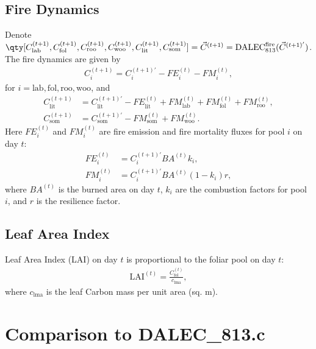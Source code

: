 \documentclass{article}
\begin{document}
		\subsection{Fire Dynamics}
			Denote $\qty[C_\text{lab}^{(t+1)}, C_\text{fol}^{(t+1)}, C_\text{roo}^{(t+1)}, C_\text{woo}^{(t+1)}, C_\text{lit}^{(t+1)}, C_\text{som}^{(t+1)}] = \vec{C}^{(t+1)} = \text{DALEC}_{813}^\text{fire}(\vec{C}^{(t+1)'})$.  The fire dynamics are given by
			\begin{align}
				C_i^{(t+1)} = C_i^{(t+1)'} - FE_i^{(t)} - FM_i^{(t)},
			\end{align}
			for $i = \text{lab}, \text{fol}, \text{roo}, \text{woo}$, and
			\begin{align}
				C_\text{lit}^{(t+1)} &= C_\text{lit}^{(t+1)'}  - FE_\text{lit}^{(t)} + FM_\text{lab}^{(t)} + FM_\text{fol}^{(t)} + FM_\text{roo}^{(t)},\\
				C_\text{som}^{(t+1)} &= C_\text{som}^{(t+1)'} - FM_\text{som}^{(t)} + FM_\text{woo}^{(t)}.
			\end{align}
			Here $FE_i^{(t)}$ and $FM_i^{(t)}$ are fire emission and fire mortality fluxes for pool $i$ on day $t$:
			\begin{align}
				FE_i^{(t)} &= C_i^{(t+1)'}BA^{(t)}k_i,\\
				FM_i^{(t)} &= C_i^{(t+1)'}BA^{(t)}(1-k_i)r,
			\end{align}
			where $BA^{(t)}$ is the burned area on day $t$, $k_i$ are the combustion factors for pool $i$, and $r$ is the resilience factor.

		\subsection{Leaf Area Index}
			Leaf Area Index (LAI) on day $t$ is proportional to the foliar pool on day $t$:
			\begin{align}
				\text{LAI}^{(t)} = \frac{C_\text{fol}^{(t)}}{c_\text{lma}},
			\end{align}
			where $c_\text{lma}$ is the leaf Carbon mass per unit area (sq. m).

	\section{Comparison to DALEC\_813.c}
\end{document}
